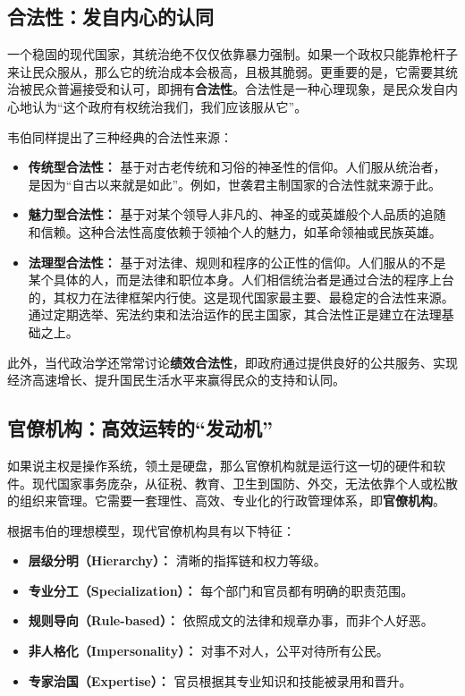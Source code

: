 \subsection{合法性：发自内心的认同}

一个稳固的现代国家，其统治绝不仅仅依靠暴力强制。如果一个政权只能靠枪杆子来让民众服从，那么它的统治成本会极高，且极其脆弱。更重要的是，它需要其统治被民众普遍接受和认可，即拥有\textbf{合法性}。合法性是一种心理现象，是民众发自内心地认为“这个政府有权统治我们，我们应该服从它”。

韦伯同样提出了三种经典的合法性来源：
\begin{itemize}
    \item \textbf{传统型合法性：} 基于对古老传统和习俗的神圣性的信仰。人们服从统治者，是因为“自古以来就是如此”。例如，世袭君主制国家的合法性就来源于此。
    \item \textbf{魅力型合法性：} 基于对某个领导人非凡的、神圣的或英雄般个人品质的追随和信赖。这种合法性高度依赖于领袖个人的魅力，如革命领袖或民族英雄。
    \item \textbf{法理型合法性：} 基于对法律、规则和程序的公正性的信仰。人们服从的不是某个具体的人，而是法律和职位本身。人们相信统治者是通过合法的程序上台的，其权力在法律框架内行使。这是现代国家最主要、最稳定的合法性来源。通过定期选举、宪法约束和法治运作的民主国家，其合法性正是建立在法理基础之上。
\end{itemize}

此外，当代政治学还常常讨论\textbf{绩效合法性}，即政府通过提供良好的公共服务、实现经济高速增长、提升国民生活水平来赢得民众的支持和认同。

\subsection{官僚机构：高效运转的“发动机”}

如果说主权是操作系统，领土是硬盘，那么官僚机构就是运行这一切的硬件和软件。现代国家事务庞杂，从征税、教育、卫生到国防、外交，无法依靠个人或松散的组织来管理。它需要一套理性、高效、专业化的行政管理体系，即\textbf{官僚机构}。

根据韦伯的理想模型，现代官僚机构具有以下特征：
\begin{itemize}
    \item \textbf{层级分明（Hierarchy）：} 清晰的指挥链和权力等级。
    \item \textbf{专业分工（Specialization）：} 每个部门和官员都有明确的职责范围。
    \item \textbf{规则导向（Rule-based）：} 依照成文的法律和规章办事，而非个人好恶。
    \item \textbf{非人格化（Impersonality）：} 对事不对人，公平对待所有公民。
    \item \textbf{专家治国（Expertise）：} 官员根据其专业知识和技能被录用和晋升。
\end{itemize}

